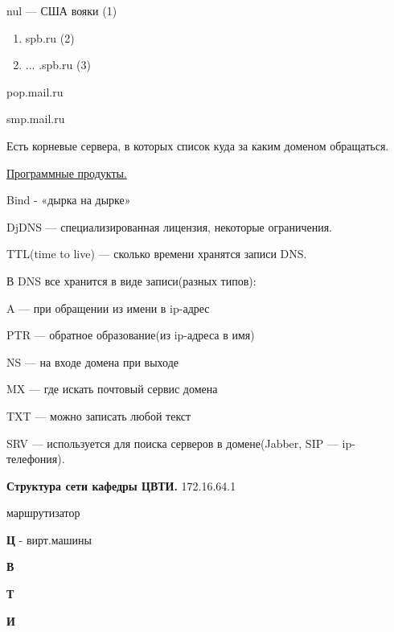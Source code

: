 \par 
nul — США вояки     (1)
\begin{enumerate}
	\item \par 
	spb.ru  (2)
	\item \par 
	... .spb.ru (3)
\end{enumerate}
\par 
pop.mail.ru
\par 
smp.mail.ru
\par 
Есть корневые сервера, в которых
список куда за каким доменом обращаться.
\par 
\underline{Программные продукты.}
\par 
Bind - «дырка на дырке»
\par 
DjDNS — специализированная лицензия,
некоторые ограничения.
\par 
TTL(time to live) — сколько времени хранятся
записи DNS.
\par 
В DNS все хранится в виде записи(разных
типов):
\par 
A — при обращении из имени в ip-адрес
\par 
PTR — обратное образование(из ip-адреса
в имя)
\par 
NS — на входе домена при выходе
\par 
MX — где искать почтовый сервис домена
\par 
TXT — можно записать любой текст
\par 
SRV — используется для поиска серверов
в домене(Jabber, SIP — ip-телефония).
\par 


\par \textbf{Структура
сети кафедры ЦВТИ.          }172.16.64.1
\par 


\par 


\par 

                                                                
маршрутизатор
\par 
    \textbf{Ц}			
      - вирт.машины
\par 
    \textbf{В}				
\par 
    \textbf{Т}
\par 
    \textbf{И}
\par 


\par 


